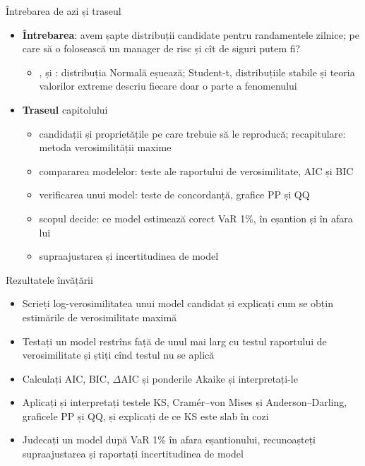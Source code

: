 \begin{frame}{Întrebarea de azi și traseul}
\itemsize{\small}
\begin{itemize}
    \item \textbf{Întrebarea}: avem șapte distribuții candidate pentru randamentele zilnice; pe care să o folosească un manager de risc și cît de siguri putem fi?
    \begin{itemize}
        \item {},  și : distribuția Normală eșuează; Student-t, distribuțiile stabile și teoria valorilor extreme descriu fiecare doar o parte a fenomenului
    \end{itemize}
    \item \textbf{Traseul} capitolului
    \begin{itemize}
        \item candidații și proprietățile pe care trebuie să le reproducă; recapitulare: metoda verosimilității maxime
        \item compararea modelelor: teste ale raportului de verosimilitate, AIC și BIC
        \item verificarea unui model: teste de concordanță, grafice PP și QQ
        \item scopul decide: ce model estimează corect VaR 1\%, în eșantion și în afara lui
        \item supraajustarea și incertitudinea de model
    \end{itemize}
\end{itemize}
\end{frame}

\begin{frame}{Rezultatele învățării}
\itemsize{\small}
\begin{itemize}
    \item Scrieți log-verosimilitatea unui model candidat și explicați cum se obțin estimările de verosimilitate maximă
    \item Testați un model restrîns față de unul mai larg cu testul raportului de verosimilitate și știți cînd testul nu se aplică
    \item Calculați AIC, BIC, $\Delta$AIC și ponderile Akaike și interpretați-le
    \item Aplicați și interpretați testele KS, Cramér--von Mises și Anderson--Darling, graficele PP și QQ, și explicați de ce KS este slab în cozi
    \item Judecați un model după VaR 1\% în afara eșantionului, recunoașteți supraajustarea și raportați incertitudinea de model
\end{itemize}
\end{frame}


